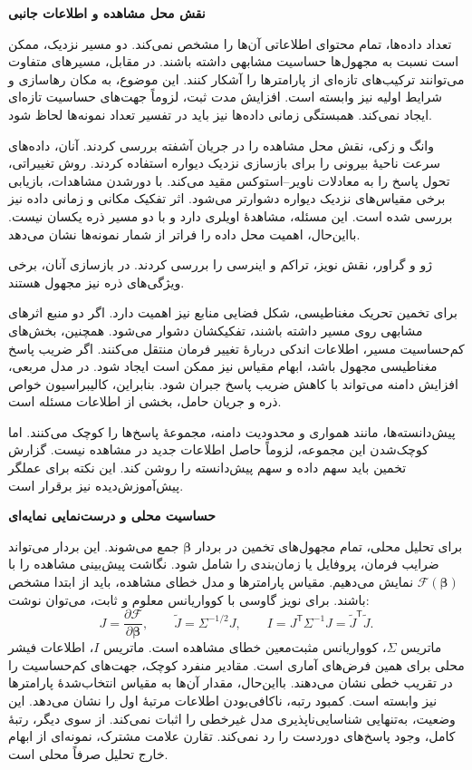 \textbf{نقش محل مشاهده و اطلاعات جانبی}

تعداد داده‌ها، تمام محتوای اطلاعاتی آن‌ها را مشخص نمی‌کند.
دو مسیر نزدیک، ممکن است نسبت به مجهول‌ها حساسیت مشابهی داشته باشند.
در مقابل، مسیرهای متفاوت می‌توانند ترکیب‌های تازه‌ای از پارامترها را آشکار کنند.
این موضوع، به مکان رهاسازی و شرایط اولیه نیز وابسته است.
افزایش مدت ثبت، لزوماً جهت‌های حساسیت تازه‌ای ایجاد نمی‌کند.
همبستگی زمانی داده‌ها نیز باید در تفسیر تعداد نمونه‌ها لحاظ شود.

وانگ و زکی، نقش محل مشاهده را در جریان آشفته بررسی کردند.
آنان، داده‌های سرعت ناحیهٔ بیرونی را برای بازسازی نزدیک دیواره استفاده کردند.
روش تغییراتی، تحول پاسخ را به معادلات ناویر–استوکس مقید می‌کند.
با دورشدن مشاهدات، بازیابی برخی مقیاس‌های نزدیک دیواره دشوارتر می‌شود.
اثر تفکیک مکانی و زمانی داده نیز بررسی شده است.
این مسئله، مشاهدهٔ اویلری دارد و با دو مسیر ذره یکسان نیست.
بااین‌حال، اهمیت محل داده را فراتر از شمار نمونه‌ها نشان می‌دهد.
\cite{WangZaki2025OuterObservations}

ژو و گراور، نقش نویز، تراکم و اینرسی را بررسی کردند.
در بازسازی آنان، برخی ویژگی‌های ذره نیز مجهول هستند.
\cite{ZhouGrauer2026Joint}

برای تخمین تحریک مغناطیسی، شکل فضایی منابع نیز اهمیت دارد.
اگر دو منبع اثرهای مشابهی روی مسیر داشته باشند، تفکیکشان دشوار می‌شود.
همچنین، بخش‌های کم‌حساسیت مسیر، اطلاعات اندکی دربارهٔ تغییر فرمان منتقل می‌کنند.
اگر ضریب پاسخ مغناطیسی مجهول باشد، ابهام مقیاس نیز ممکن است ایجاد شود.
در مدل مربعی، افزایش دامنه می‌تواند با کاهش ضریب پاسخ جبران شود.
بنابراین، کالیبراسیون خواص ذره و جریان حامل، بخشی از اطلاعات مسئله است.

پیش‌دانسته‌ها، مانند همواری و محدودیت دامنه، مجموعهٔ پاسخ‌ها را کوچک می‌کنند.
اما کوچک‌شدن این مجموعه، لزوماً حاصل اطلاعات جدید در مشاهده نیست.
گزارش تخمین باید سهم داده و سهم پیش‌دانسته را روشن کند.
این نکته برای عملگر پیش‌آموزش‌دیده نیز برقرار است.

\textbf{حساسیت محلی و درست‌نمایی نمایه‌ای}

برای تحلیل محلی، تمام مجهول‌های تخمین در بردار $\boldsymbol\beta$ جمع می‌شوند.
این بردار می‌تواند ضرایب فرمان، پروفایل یا زمان‌بندی را شامل شود.
نگاشت پیش‌بینی مشاهده را با $\mathcal F(\boldsymbol\beta)$ نمایش می‌دهیم.
مقیاس پارامترها و مدل خطای مشاهده، باید از ابتدا مشخص باشند.
برای نویز گاوسی با کوواریانس معلوم و ثابت، می‌توان نوشت:
\begin{equation}
J=\frac{\partial\mathcal F}{\partial\boldsymbol\beta},
\qquad
\widetilde J=\Sigma^{-1/2}J,
\qquad
I=J^{\mathsf T}\Sigma^{-1}J
=\widetilde J^{\mathsf T}\widetilde J.
\label{eq:lit-identifiability-sensitivity}
\end{equation}
ماتریس $\Sigma$، کوواریانس مثبت‌معین خطای مشاهده است.
ماتریس $I$، اطلاعات فیشر محلی برای همین فرض‌های آماری است.
مقادیر منفرد کوچک، جهت‌های کم‌حساسیت را در تقریب خطی نشان می‌دهند.
بااین‌حال، مقدار آن‌ها به مقیاس انتخاب‌شدهٔ پارامترها نیز وابسته است.
کمبود رتبه، ناکافی‌بودن اطلاعات مرتبهٔ اول را نشان می‌دهد.
این وضعیت، به‌تنهایی شناسایی‌ناپذیری مدل غیرخطی را اثبات نمی‌کند.
از سوی دیگر، رتبهٔ کامل، وجود پاسخ‌های دوردست را رد نمی‌کند.
تقارن علامت مشترک، نمونه‌ای از ابهام خارج تحلیل صرفاً محلی است.

